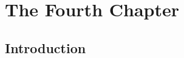 \documentclass[../main.tex]{subfiles}
\begin{document}
\chapter{The Fourth Chapter}
\section{Introduction}
\lipsum[4]
\end{document}
